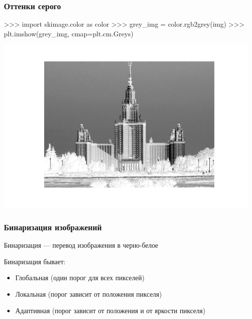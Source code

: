 \documentclass[fleqn, xcolor=x11names]{beamer}
\begin{document}
\begin{frame}[fragile]\frametitle{Оттенки серого}
\begin{pcode}
>>> import skimage.color as color
>>> grey_img = color.rgb2grey(img)
>>> plt.imshow(grey_img, cmap=plt.cm.Greys)
\end{pcode}
\includegraphics[scale=0.45]{images/img_grey.png}

\end{frame}

\begin{frame}[fragile]\frametitle{Бинаризация изображений}
Бинаризация --- перевод изображения в черно-белое

\hfill

Бинаризация бывает:
\begin{itemize}
    \item Глобальная (один порог для всех пикселей)
    \item Локальная (порог зависит от положения пикселя)
    \item Адаптивная (порог зависит от положения и от яркости пикселя)
\end{itemize}
\end{frame}
\end{document}
